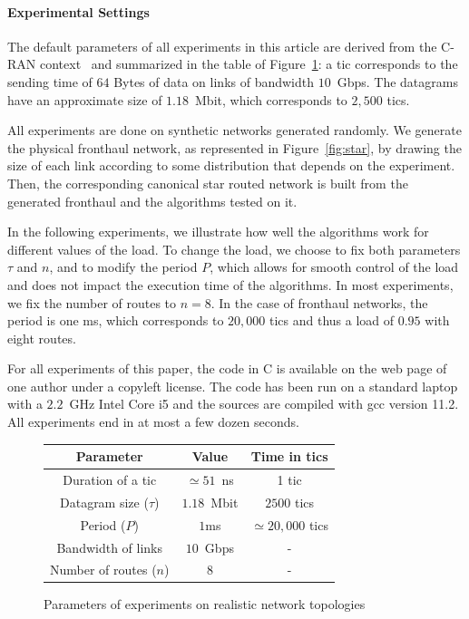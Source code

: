 \documentclass[a4paper,10pt]{journal}
\begin{document}
   \paragraph{Experimental Settings}


     The default parameters of all experiments in this article are derived from the C-RAN context~\cite{wang2017cloud} and summarized in the table of Figure~\ref{tab:params}: a tic corresponds to the sending time of $64$ Bytes of data on links of bandwidth $10$~Gbps. The datagrams have an approximate size of $1.18$~Mbit, which corresponds to $2,500$ tics. 

     All experiments are done on synthetic networks generated randomly. We generate the physical fronthaul
     network, as represented in Figure~\ref{fig:star}, by drawing the size of each link according to some distribution that depends on the experiment. Then, the corresponding canonical star routed network is built from the generated fronthaul and the algorithms tested on it. 

     In the following experiments, we illustrate how well the algorithms work for different values of the load. To change the load, we choose to fix both parameters $\tau$ and $n$, and to modify the period $P$, which allows for smooth control of the load and does not impact the execution time of the algorithms. In most experiments, we fix the number of routes to $n = 8$. In the case of fronthaul networks, the period is one ms, which corresponds to $20,000$ tics and thus a load of $0.95$ with eight routes.

     For all experiments of this paper, the code in C is available on the web page of one author\cite{webpage} under a copyleft license. The code has been run on a standard laptop with a $2.2$~GHz Intel Core i5 and the sources are compiled with gcc version 11.2. All experiments end in at most a few dozen seconds.
\begin{figure}
\begin{center}
\begin{tabular}{|c|c|c|}
\hline
Parameter& Value & Time in tics \\
\hline
Duration of a tic& $\simeq51$~ns&1 tic\\
\hline
Datagram size ($\tau$)&  $1.18$~Mbit & $2500$ tics\\
\hline
Period ($P$)& $1$ms&$\simeq20,000$ tics\\
\hline
Bandwidth of links &  $10$~Gbps & -\\
\hline
Number of routes ($n$) & $8$ & -\\
\hline
\end{tabular}

\end{center}

\caption{Parameters of experiments on realistic network topologies}
\label{tab:params}
\end{figure}
\end{document}
